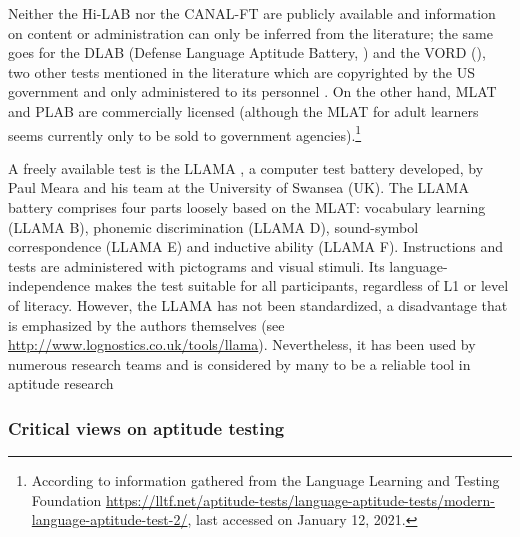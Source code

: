 \documentclass[output=paper]{langscibook}
\begin{document}
Neither the Hi-LAB nor the CANAL-FT are publicly available and information on content or administration can only be inferred from the literature; the same goes for the DLAB (Defense Language Aptitude Battery, \citealt{PetersenAlHaik1976}) and the VORD (\citealt{ParryChild1990}), two other tests mentioned in the literature which are copyrighted by the US government and only administered to its personnel \citep{Robinson2002}. On the other hand, MLAT and PLAB are commercially licensed (although the MLAT for adult learners seems currently only to be sold to government agencies).\footnote{According to information gathered from the Language Learning and Testing Foundation \url{https://lltf.net/aptitude-tests/language-aptitude-tests/modern-language-aptitude-test-2/}, last accessed on January 12, 2021.}

A freely available test is the LLAMA \citep{MearaEtAl2001}, a computer test battery developed, by Paul Meara and his team at the University of Swansea (UK). The LLAMA battery comprises four parts loosely based on the MLAT: vocabulary learning (LLAMA B), phonemic discrimination (LLAMA D), sound-symbol correspondence (LLAMA E) and inductive ability (LLAMA F). Instructions and tests are administered with pictograms and visual stimuli. Its language-independence makes the test suitable for all participants, regardless of L1 or level of literacy. However, the LLAMA has not been standardized, a disadvantage that is emphasized by the authors themselves (see \url{http://www.lognostics.co.uk/tools/llama}{).} Nevertheless, it has been used by numerous research teams and is considered by many to be a reliable tool in aptitude research \citep{RogersEtAl2017}

\subsubsection{Critical views on aptitude testing} %
\end{document}
